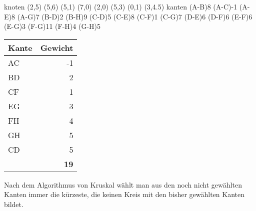 \documentclass{lehramt-informatik-minimal}
\begin{document}
\begin{minipage}{8cm}
\graph knoten {
  (2,5)
  (5,6)
  (5,1)
  (7,0)
  (2,0)
  (5,3)
  (0,1)
  (3,4.5)
} kanten {
  \kante(A-B){8}
  \KANTE(A-C){-1}
  \kante(A-E){8}
  \kante(A-G){7}
  \KANTE(B-D){2}
  \kante(B-H){9}
  \KANTE(C-D){5}
  \kante(C-E){8}
  \KANTE(C-F){1}
  \kante(C-G){7}
  \kante(D-E){6}
  \kante(D-F){6}
  \kante(E-F){6}
  \KANTE(E-G){3}
  \kante(F-G){11}
  \KANTE(F-H){4}
  \KANTE(G-H){5}
}
\end{minipage}
\begin{minipage}{4cm}
\begin{tabular}{lr}
Kante & Gewicht \\
\hline
AC & -1 \\
BD & 2 \\
CF & 1 \\
EG & 3 \\
FH & 4 \\
GH & 5 \\
CD & 5 \\\hline
& \textbf{19} \\
\end{tabular}
\end{minipage}

Nach dem Algorithmus von Kruskal wählt man aus den noch nicht gewählten
Kanten immer die kürzeste, die keinen Kreis mit den bisher gewählten
Kanten bildet.
\end{document}
